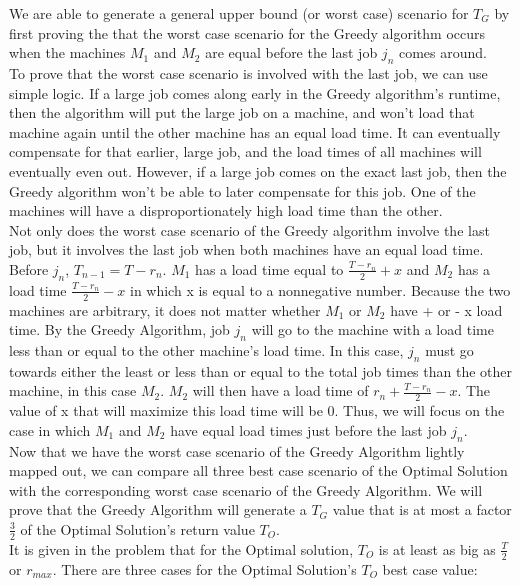 \documentclass[11pt, solution, letterpaper]{format}
\begin{document}
We are able to generate a general upper bound (or worst case) scenario for $T_G$ by first proving the that the worst case scenario for the Greedy algorithm occurs when the machines $M_1$ and $M_2$ are equal before the last job $j_n$ comes around.\\

To prove that the worst case scenario is involved with the last job, we can use simple logic. If a large job comes along early in the Greedy algorithm's runtime, then the algorithm will put the large job on a machine, and won't load that machine again until the other machine has an equal load time. It can eventually compensate for that earlier, large job, and the load times of all machines will eventually even out. However, if a large job comes on the exact last job, then the Greedy algorithm won't be able to later compensate for this job. One  of the machines will have a disproportionately high load time than the other. \\

Not only does the worst case scenario of the Greedy algorithm involve the last job, but it involves the last job when both machines have an equal load time. Before $j_n$, $T_{n-1} = T - r_n$. $M_1$ has a load time equal to $\frac{T - r_n}{2} + x$ and $M_2$ has a load time $\frac{T - r_n}{2} - x$ in which x is equal to a nonnegative number. Because the two machines are arbitrary, it does not matter whether $M_1$ or $M_2$ have + or - x load time. By the Greedy Algorithm, job $j_n$ will go to the machine with a load time less than or equal to the other machine's load time. In this case, $j_n$ must go towards  either the least or less than or equal to the total job times than the other machine, in this case $M_2$. $M_2$ will then have a load time of $r_n + \frac{T - r_n}{2} - x$. The value of x that will maximize this load time will be 0. Thus, we will focus on the case in which $M_1$ and $M_2$ have equal load times just before the last job $j_n$.\\

Now that we have the worst case scenario of the Greedy Algorithm lightly mapped out, we can compare all three best case scenario of the Optimal Solution with the corresponding worst case scenario of the Greedy Algorithm. We will prove that the Greedy Algorithm will generate a $T_G$ value that is at most a factor $\frac{3}{2}$ of the Optimal Solution's return value $T_O$.\\

It is given in the problem that for the Optimal solution, $T_O$ is at least as big as $\frac{T}{2}$ or $r_{max}$. There are three cases for the Optimal Solution's $T_O$ best case value:\\
\end{document}
